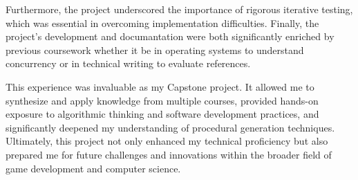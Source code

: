 \documentclass[a4paper, 12pt, one column, aas_macros]{article}
\begin{document}
Furthermore, the project underscored the importance of rigorous iterative testing, which was essential in overcoming implementation difficulties. Finally, the project's development and documantation were both significantly enriched by previous coursework whether it be in operating systems to understand concurrency or in technical writing to evaluate references.

This experience was invaluable as my Capstone project. It allowed me to synthesize and apply knowledge from multiple courses, provided hands-on exposure to algorithmic thinking and software development practices, and significantly deepened my understanding of procedural generation techniques. Ultimately, this project not only enhanced my technical proficiency but also prepared me for future challenges and innovations within the broader field of game development and computer science.


\end{document}
